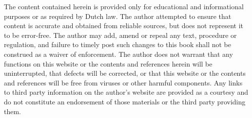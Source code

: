 \documentclass[
]{book}
\begin{document}
The content contained herein is provided only for educational and informational purposes or as required by Dutch law. The author attempted to ensure that content is accurate and obtained from reliable sources, but does not represent it to be error-free. The author may add, amend or repeal any text, procedure or regulation, and failure to timely post such changes to this book shall not be construed as a waiver of enforcement. The author does not warrant that any functions on this website or the contents and references herein will be uninterrupted, that defects will be corrected, or that this website or the contents and references will be free from viruses or other harmful components. Any links to third party information on the author's website are provided as a courtesy and do not constitute an endorsement of those materials or the third party providing them.

  
\end{document}

